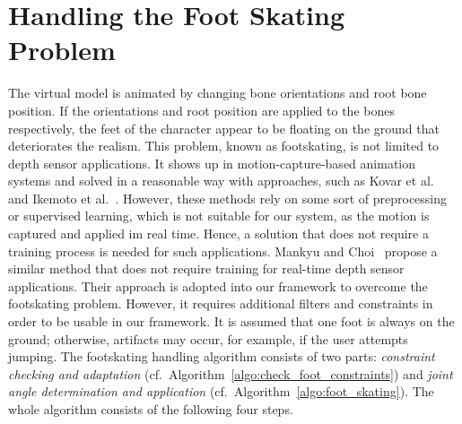 \section{Handling the Foot Skating Problem}
\label{section_foot_skating}
The virtual model is animated by changing bone orientations and root bone position. If the orientations and root position are applied to the bones respectively, the feet of the character appear to be floating on the ground that deteriorates the realism. 
This problem, known as footskating, is not limited to depth sensor applications. It shows up in motion-capture-based animation systems and solved in a reasonable way with approaches, such as Kovar et al.~\cite{Kovar2002} and Ikemoto et al.~\cite{Ikemoto2006}. However, these methods rely on some sort of preprocessing or supervised learning, which is not suitable for our system, as the motion is captured and applied im real time. Hence, a solution that does not require a training process is needed for such applications. Mankyu and Choi~\cite{Mankyu2013} propose a similar method that does not require training for real-time depth sensor applications. Their approach is adopted into our framework to overcome the footskating problem. However, it requires additional filters and constraints in order to be usable in our framework. It is assumed that one foot is always on the ground; otherwise, artifacts may occur, for example, if the user attempts jumping. The footskating handling algorithm consists of two parts: {\em constraint checking and adaptation} (cf.~Algorithm~\ref{algo:check_foot_constraints}) and {\em joint angle determination and application} (cf.~Algorithm~\ref{algo:foot_skating}). The whole   algorithm consists of the following four steps. 

